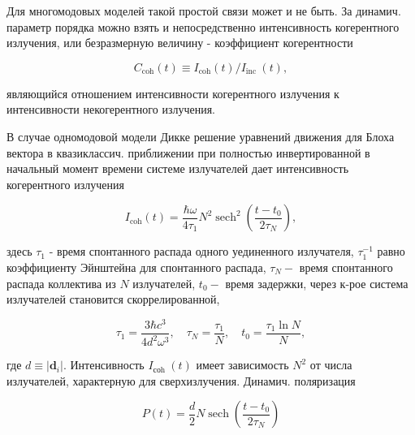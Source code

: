 \documentclass[10pt]{article}
\begin{document}
Для многомодовых моделей такой простой связи может и не быть. За динамич. параметр порядка можно взять и непосредственно интенсивность когерентного излучения, или безразмерную величину - коэффициент когерентности



\[

C_{\operatorname{coh}}(t) \equiv I_{\operatorname{coh}}(t) / I_{\text {inc }}(t),

\]



являющийся отношением интенсивности когерентного излучения к интенсивности некогерентного излучения.



В случае одномодовой модели Дикке решение уравнений движения для Блоха вектора в квазиклассич. приближении при полностью инвертированной в начальный момент времени системе излучателей дает интенсивность когерентного излучения



\[

I_{\operatorname{coh}}(t)=\frac{\hbar \omega}{4 \tau_{1}} N^{2} \operatorname{sech}^{2}\left(\frac{t-t_{0}}{2 \tau_{N}}\right),

\]



здесь $\tau_{1}$ - время спонтанного распада одного уединенного излучателя, $\tau_{1}^{-1}$ равно коэффициенту Эйнштейна для спонтанного распада, $\tau_{N}-$ время спонтанного распада коллектива из $N$ излучателей, $t_{0}-$ время задержки, через к-рое система излучателей становится скоррелированной,



\[

\tau_{1}=\frac{3 \hbar c^{3}}{4 d^{2} \omega^{3}}, \quad \tau_{N}=\frac{\tau_{1}}{N}, \quad t_{0}=\frac{\tau_{1} \ln N}{N},

\]



где $d \equiv\left|\boldsymbol{d}_{i}\right|$. Интенсивность $I_{\text {соh }}(t)$ имеет зависимость $N^{2}$ от числа излучателей, характерную для сверхизлучения. Динамич. поляризация



\[

P(t)=\frac{d}{2} N \operatorname{sech}\left(\frac{t-t_{0}}{2 \tau_{N}}\right)

\]
\end{document}
